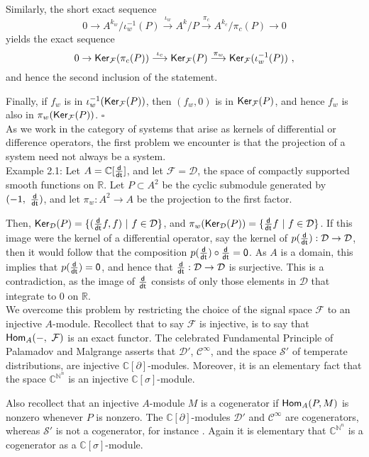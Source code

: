 \documentclass[11pt]{amsart}
\def\homo{\mathop{\sf Hom}}
\def\ker{\mathop{\sf Ker}}
\def\dbydt{\sf \frac{d}{dt}}
\def\Cinf{\mathcal{C}^\infty}
\def\Dr{\mathcal{D}'}
\def\Sr{\mathcal{S}'}
\def\D{\mathcal{D}}
\def\C{\mathbb{C}}
\def\N{\mathbb{N}}
\def\R{\mathbb{R}}
\newcommand{\F}{\mathcal{F}}
\begin{document}
{Similarly, the short exact sequence 
\[ 0 \rightarrow A^{k_w}/\iota_w^{-1}(P) \stackrel {\iota_w}{\longrightarrow} A^k/P  \stackrel{\pi_c}{\longrightarrow} A^{k_c}/\pi_c(P) \rightarrow 0
\]
yields the exact sequence 
\[ 0 \rightarrow {\ker}_\F(\pi_c(P)) \stackrel{\iota_c}{\longrightarrow} {\ker}_\F(P) \stackrel{\pi_w}{\longrightarrow} {\ker}_\F(\iota_w^{-1}(P)) ~,
\]
and hence the second inclusion of the statement. 

Finally, if $f_w$ is in $\iota_w^{-1}({\ker}_\F(P))$, then $(f_w,0)$ is in $\ker_\F(P)$, and hence $f_w$ is also in $\pi_w(\ker_\F(P))$.
\hspace*{\fill}$\square$\\
 

As we work in the category of systems that arise as kernels of differential or difference operators, the first problem we encounter is that the projection of a system need not always be a system. \\

\noindent Example 2.1: Let $A=\mathbb{C}[\dbydt]$, and let $\F = \D$, the space of compactly supported smooth functions on $\R$. Let $P \subset A^2$ be the cyclic submodule generated by $(-1, ~\dbydt)$, and let $\pi_w: A^2 \rightarrow A$ be the projection to the first factor.

Then, $\ker_\D(P) = \{({\dbydt}f, f)~|~ f \in \D \}$,  and $\pi_w(\ker_\D(P))  = \{{\dbydt}f ~|~ f \in \D \}$. If this image were the  kernel of a differential operator, say the kernel of  $p(\dbydt): \D \rightarrow \D$, then it would follow that the composition $p(\dbydt) \circ \dbydt  = 0$. As $A$ is a domain, this implies that $p(\dbydt) = 0$, and hence that ${\dbydt}: \D \rightarrow \D$ is surjective. This is a contradiction, as the image of $\dbydt$  consists of only those elements in $\D$ that integrate to 0 on $\R$.\\

We overcome this problem by restricting the choice of the signal space $\F$ to an injective $A$-module. Recollect that to say $\F$ is injective, is to say that $\homo_A( -, ~\F)$ is an exact functor. The celebrated Fundamental Principle of Palamadov and Malgrange asserts that $\Dr$, $\Cinf$, and  the space $\Sr$ of temperate distributions, are injective $\C[\partial]$-modules. Moreover, it is an elementary fact that the space $\C^{\N^n}$ is an injective $\C[\sigma]$-module.

Also recollect that an injective $A$-module $M$ is a cogenerator if $\homo_A(P, M)$ is nonzero whenever $P$ is nonzero. The $\C[\partial]$-modules $\Dr$ and $\Cinf$ are cogenerators, whereas $\Sr$ is not a cogenerator, for instance \cite{sst}. Again it is elementary that $\C^{\N^n}$ is a cogenerator as a $\C[\sigma]$-module.

}
\end{document}
